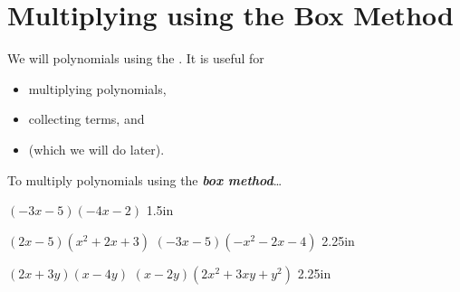 \section{Multiplying using the Box Method}

We will  polynomials using the .
It is useful for
\begin{itemize}[topsep=0in]
    \item multiplying  polynomials,
    \item collecting  terms, and 
    \item {} (which we will do later).
\end{itemize}
\vspace{1\baselineskip}

\begin{myConceptSteps}{To multiply polynomials using the {\bfseries\itshape box method}\dots}
\end{myConceptSteps}


    {
        $ (-3x-5) (-4x-2) $
    }
    {1.5in}


    \myProblems
    {
        $ (2x-5) (x^2 + 2x + 3) $
    }
    {
        $ (-3x-5) (-x^2 - 2x - 4) $
    }
    {2.25in}


    \myProblems
    {
        $ (2x+3y) (x-4y) $
    }
    {
        $ (x-2y) (2x^2 + 3xy + y^2) $
    }
    {2.25in}

